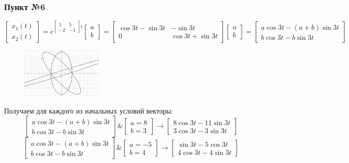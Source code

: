 \documentclass[a3paper,14pt]{extarticle}
\begin{document}
\subsubsection*{Пункт №6}
$$\begin{bmatrix}
    x_1(t) \\ x_2(t)
\end{bmatrix} = e^{\left[\begin{smallmatrix}
    1 & 5 \\ -2 & -1
\end{smallmatrix}\right]t}\begin{bmatrix}
    a \\ b
\end{bmatrix} = \begin{bmatrix}
    \cos{3t}-\sin{3t} & -\sin{3t} \\ 0 & \cos{3t}+\sin{3t}
\end{bmatrix}\begin{bmatrix}
    a \\ b
\end{bmatrix} = \begin{bmatrix}
    a\cos{3t}-(a+b)\sin{3t} \\ b\cos{3t}-b\sin{3t}
\end{bmatrix}$$
\begin{figure}
    \centering
    \includegraphics[width=0.35\textwidth]{2.5.png}
\end{figure}
Получаем для каждого из начальных условий векторы: $$\begin{bmatrix}
    a\cos{3t}-(a+b)\sin{3t} \\ b\cos{3t}-b\sin{3t}
\end{bmatrix} \& \begin{bmatrix}
    a = 8 \\ b = 3
\end{bmatrix} \rightarrow \begin{bmatrix}
    8\cos{3t}-11\sin{3t} \\ 3\cos{3t}-3\sin{3t}
\end{bmatrix}$$
$$\begin{bmatrix}
    a\cos{3t}-(a+b)\sin{3t} \\ b\cos{3t}-b\sin{3t}
\end{bmatrix} \& \begin{bmatrix}
    a=-5 \\b= 4
\end{bmatrix} \rightarrow \begin{bmatrix}
    \sin{3t}-5\cos{3t} \\ 4\cos{3t}-4\sin{3t}
\end{bmatrix}$$
\end{document}
